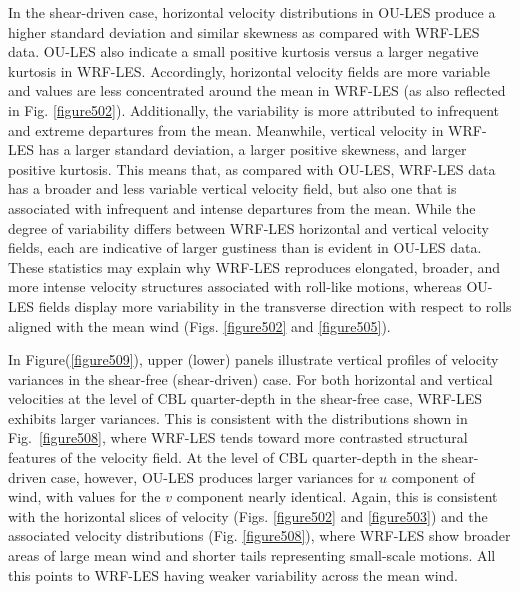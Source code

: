 In the shear-driven case, horizontal velocity distributions in OU-LES produce a higher standard deviation and similar skewness as compared with WRF-LES data. OU-LES also indicate a small positive kurtosis versus a larger negative kurtosis in WRF-LES. Accordingly, horizontal velocity fields are more variable and values are less concentrated around the mean in WRF-LES (as also reflected in Fig. \autoref{figure502}). Additionally, the variability is more attributed to infrequent and extreme departures from the mean. Meanwhile, vertical velocity in WRF-LES has a larger standard deviation, a larger positive skewness, and larger positive kurtosis. This means that, as compared with OU-LES, WRF-LES data has a broader and less variable vertical velocity field, but also one that is associated with infrequent and intense departures from the mean. While the degree of variability differs between WRF-LES horizontal and vertical velocity fields, each are indicative of larger gustiness than is evident in OU-LES data. These statistics may explain why WRF-LES reproduces elongated, broader, and more intense velocity structures associated with roll-like motions, whereas OU-LES fields display more variability in the transverse direction with respect to rolls aligned with the mean wind (Figs. \autoref{figure502} and \autoref{figure505}).

In Figure(\autoref{figure509}), upper (lower) panels illustrate vertical profiles of velocity variances in the shear-free (shear-driven) case. For both horizontal and vertical velocities at the level of CBL quarter-depth in the shear-free case, WRF-LES exhibits larger variances. This is consistent with the distributions shown in Fig.~\ref{figure508}, where WRF-LES tends toward more contrasted structural features of the velocity field. At the level of CBL quarter-depth in the shear-driven case, however, OU-LES produces larger variances for $u$ component of wind, with values for the $v$ component nearly identical. Again, this is consistent with the horizontal slices of velocity (Figs. \autoref{figure502} and \autoref{figure503}) and the associated velocity distributions (Fig. \autoref{figure508}), where WRF-LES show broader areas of large mean wind and shorter tails representing small-scale motions. All this points to WRF-LES having weaker variability across the mean wind.


